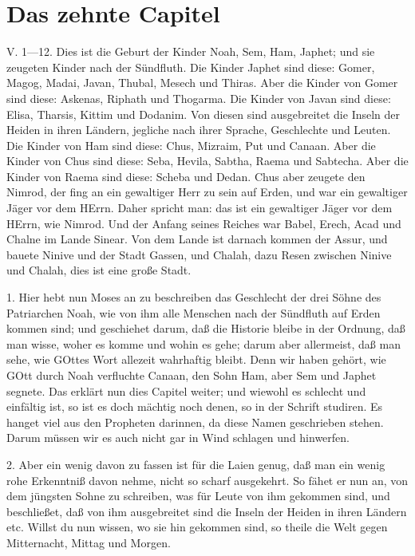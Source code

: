 \section{Das zehnte Capitel}

\begin{schriftzitat}
V. 1—12. Dies ist die Geburt der Kinder Noah, Sem, Ham, Japhet; und sie zeugeten Kinder nach der Sündfluth. Die Kinder Japhet sind diese: Gomer, Magog, Madai, Javan, Thubal, Mesech und Thiras. Aber die Kinder von Gomer sind diese: Askenas, Riphath und Thogarma. Die Kinder von Javan sind diese: Elisa, Tharsis, Kittim und Dodanim. Von diesen sind ausgebreitet die Inseln der Heiden in ihren Ländern, jegliche nach ihrer Sprache, Geschlechte und Leuten. Die Kinder von Ham sind diese: Chus, Mizraim, Put und Canaan. Aber die Kinder von Chus sind diese: Seba, Hevila, Sabtha, Raema und Sabtecha. Aber die Kinder von Raema sind diese: Scheba und Dedan. Chus aber zeugete den Nimrod, der fing an ein gewaltiger Herr zu sein auf Erden, und war ein gewaltiger Jäger vor dem HErrn. Daher spricht man: das ist ein gewaltiger Jäger vor dem HErrn, wie Nimrod. Und der Anfang seines Reiches war Babel, Erech, Acad und Chalne im Lande Sinear. Von dem Lande ist darnach kommen der Assur, und bauete Ninive und der Stadt Gassen, und Chalah, dazu Resen zwischen Ninive und Chalah, dies ist eine große Stadt.
\end{schriftzitat}

1. Hier hebt nun Moses an zu beschreiben das Geschlecht der drei Söhne des Patriarchen Noah, wie von ihm alle Menschen nach der Sündfluth auf Erden kommen sind; und geschiehet darum, daß die Historie bleibe in der Ordnung, daß man wisse, woher es komme und wohin es gehe; darum aber allermeist, daß man sehe, wie GOttes Wort allezeit wahrhaftig bleibt. Denn wir haben gehört, wie GOtt durch Noah verfluchte Canaan, den Sohn Ham, aber Sem und Japhet segnete. Das erklärt nun dies Capitel weiter; und wiewohl es schlecht und einfältig ist, so ist es doch mächtig noch denen, so in der Schrift studiren. Es hanget viel aus den Propheten darinnen, da diese Namen geschrieben stehen. Darum müssen wir es auch nicht gar in Wind schlagen und hinwerfen.

2. Aber ein wenig davon zu fassen ist für die Laien genug, daß man ein wenig rohe Erkenntniß davon nehme, nicht so scharf ausgekehrt. So fähet er nun an, von dem jüngsten Sohne zu schreiben, was für Leute von ihm gekommen sind, und beschließet, daß von ihm ausgebreitet sind die Inseln der Heiden in ihren Ländern etc. Willst du nun wissen, wo sie hin gekommen sind, so theile die Welt gegen Mitternacht, Mittag und Morgen.

